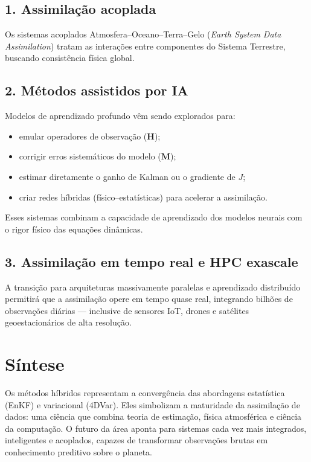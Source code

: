 \subsection*{1. Assimilação acoplada}
Os sistemas acoplados Atmosfera–Oceano–Terra–Gelo (\emph{Earth System Data Assimilation}) tratam as interações entre componentes do Sistema Terrestre, buscando consistência física global.

\subsection*{2. Métodos assistidos por IA}
Modelos de aprendizado profundo vêm sendo explorados para:
\begin{itemize}
  \item emular operadores de observação ($\mathbf{H}$);
  \item corrigir erros sistemáticos do modelo ($\mathbf{M}$);
  \item estimar diretamente o ganho de Kalman ou o gradiente de $J$;
  \item criar redes híbridas (físico–estatísticas) para acelerar a assimilação.
\end{itemize}
Esses sistemas combinam a capacidade de aprendizado dos modelos neurais com o rigor físico das equações dinâmicas.

\subsection*{3. Assimilação em tempo real e HPC exascale}
A transição para arquiteturas massivamente paralelas e aprendizado distribuído permitirá que a assimilação opere em tempo quase real, integrando bilhões de observações diárias — inclusive de sensores IoT, drones e satélites geoestacionários de alta resolução.

\section{Síntese}
Os métodos híbridos representam a convergência das abordagens estatística (EnKF) e variacional (4DVar).  
Eles simbolizam a maturidade da assimilação de dados: uma ciência que combina teoria de estimação, física atmosférica e ciência da computação.  
O futuro da área aponta para sistemas cada vez mais integrados, inteligentes e acoplados, capazes de transformar observações brutas em conhecimento preditivo sobre o planeta.

